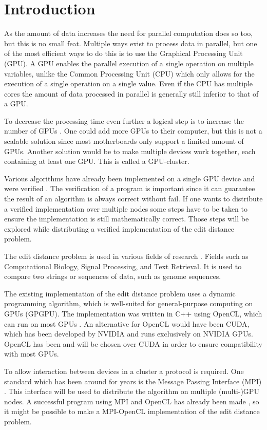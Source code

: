 \section{Introduction}
As the amount of data increases the need for parallel computation does so too, but this is no small feat.
Multiple ways exist to process data in parallel, but one of the most efficient ways to do this is to use the Graphical Processing Unit (GPU).
A GPU enables the parallel execution of a single operation on multiple variables, unlike the Common Processing Unit (CPU) which only allows for the execution of a single operation on a single value.
Even if the CPU has multiple cores the amount of data processed in parallel is generally still inferior to that of a GPU.

To decrease the processing time even further a logical step is to increase the number of GPUs \cite{Cluster}.
One could add more GPUs to their computer, but this is not a scalable solution since most motherboards only support a limited amount of GPUs.
Another solution would be to make multiple devices work together, each containing at least one GPU.
This is called a GPU-cluster.

Various algorithms have already been implemented on a single GPU device and were verified \cite{Heus}.
The verification of a program is important since it can guarantee the result of an algorithm is always correct without fail.
If one wants to distribute a verified implementation over multiple nodes some steps have to be taken to ensure the implementation is still mathematically correct.
Those steps will be explored while distributing a verified implementation of the edit distance problem.

The edit distance problem is used in various fields of research \cite{Navarro:2001:GTA:375360.375365}.
Fields such as Computational Biology, Signal Processing, and Text Retrieval.
It is used to compare two strings or sequences of data, such as genome sequences.

The existing implementation of the edit distance problem uses a dynamic programming algorithm, which is well-suited for general-purpose computing on GPUs (GPGPU).
The implementation was written in C++ using OpenCL, which can run on most GPUs \cite{Kronos:conformant}.
An alternative for OpenCL would have been CUDA, which has been developed by NVIDIA and runs exclusively on NVIDIA GPUs.
OpenCL has been and will be chosen over CUDA in order to ensure compatibility with most GPUs.

To allow interaction between devices in a cluster a protocol is required.
One standard which has been around for years is the Message Passing Interface (MPI) \cite{MPI}.
This interface will be used to distribute the algorithm on multiple (multi-)GPU nodes.
A successful program using MPI and OpenCL has already been made \cite{Cluster}, so it might be possible to make a MPI-OpenCL implementation of the edit distance problem.

